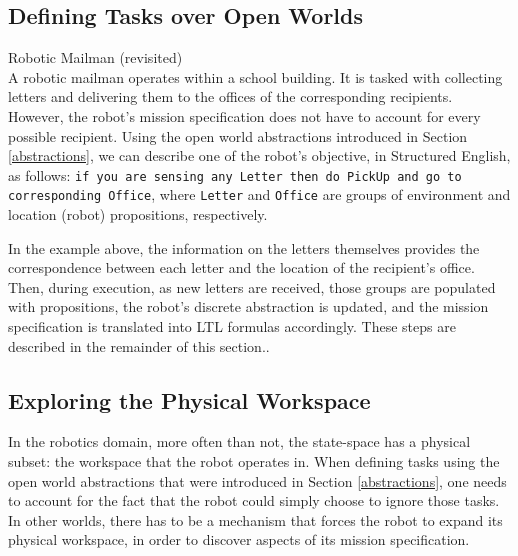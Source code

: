 \subsection{Defining Tasks over Open Worlds}

\begin{myExample}\label{Ex:mailman} Robotic Mailman (revisited)\\
	A robotic mailman operates within a school building. It is tasked with collecting letters and delivering them to the offices of the corresponding recipients. However, the robot's mission specification does not have to account for every possible recipient. Using the open world abstractions introduced in Section \ref{abstractions}, we can describe one of the robot's objective, in Structured English, as follows: 
\texttt{if you are sensing any Letter then do PickUp and go to corresponding Office}, where \texttt{Letter} and \texttt{Office} are groups of environment and location (robot) propositions, respectively.
\end{myExample}

In the example above, the information on the letters themselves provides the correspondence between each letter and the location of the recipient's office. Then, during execution, as new letters are received, those groups are populated with propositions, the robot's discrete abstraction is updated, and the mission specification is translated into LTL formulas accordingly. These steps are described in the remainder of this section..

\subsection{Exploring the Physical Workspace}

In the robotics domain, more often than not, the state-space has a physical subset: the workspace that the robot operates in. When defining tasks using the open world abstractions that were introduced in Section \ref{abstractions}, one needs to account for the fact that the robot could simply choose to ignore those tasks. In other worlds, there has to be a mechanism that forces the robot to expand its physical workspace, in order to discover aspects of its mission specification.

